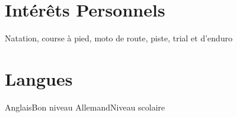 \documentclass[letterpaper]{twentysecondcv} %
\begin{document}
\begin{twenty}
\end{twenty}
\section{Intérêts Personnels}

\begin{twenty}
	\twentyitem
	{}{}{Natation, course à pied, moto de route, piste, trial et d'enduro }{}{}{}
\end{twenty}
\section{Langues}
\begin{twenty} %
	\twentyitem
    	{}{}{Anglais}{Bon niveau}{}{}
	\twentyitem
    	{}{}{Allemand}{Niveau scolaire}{}{}
\end{twenty}
\end{document}

